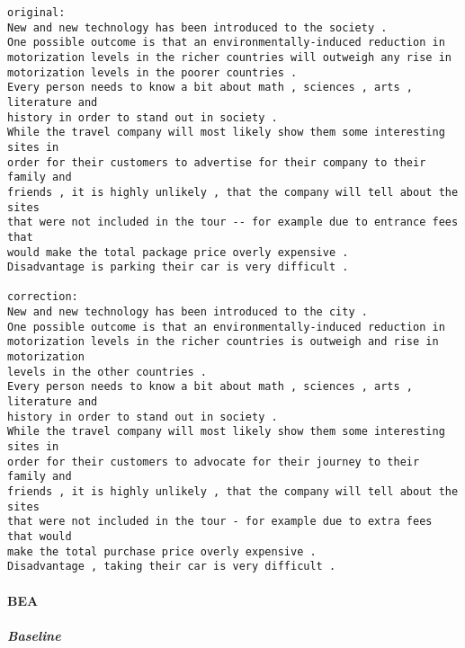 \documentclass[10pt]{article}
\begin{document}
    \begin{Verbatim}[commandchars=\\\{\}]
original:
New and new technology has been introduced to the society .
One possible outcome is that an environmentally-induced reduction in
motorization levels in the richer countries will outweigh any rise in
motorization levels in the poorer countries .
Every person needs to know a bit about math , sciences , arts , literature and
history in order to stand out in society .
While the travel company will most likely show them some interesting sites in
order for their customers to advertise for their company to their family and
friends , it is highly unlikely , that the company will tell about the sites
that were not included in the tour -- for example due to entrance fees that
would make the total package price overly expensive .
Disadvantage is parking their car is very difficult .

correction:
New and new technology has been introduced to the city .
One possible outcome is that an environmentally-induced reduction in
motorization levels in the richer countries is outweigh and rise in motorization
levels in the other countries .
Every person needs to know a bit about math , sciences , arts , literature and
history in order to stand out in society .
While the travel company will most likely show them some interesting sites in
order for their customers to advocate for their journey to their family and
friends , it is highly unlikely , that the company will tell about the sites
that were not included in the tour - for example due to extra fees that would
make the total purchase price overly expensive .
Disadvantage , taking their car is very difficult .
    \end{Verbatim}

    \hypertarget{bea}{%
\paragraph{BEA}\label{bea}}

    \hypertarget{baseline}{%
\subparagraph{Baseline}\label{baseline}}
\end{document}
